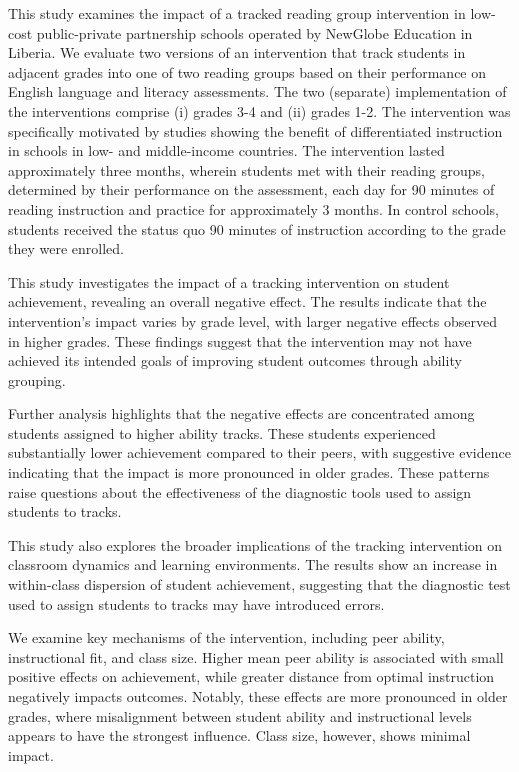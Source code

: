 \documentclass[12pt]{article}
\begin{document}
This study examines the impact of a tracked reading group intervention in low-cost public-private partnership schools operated by NewGlobe Education in Liberia. We evaluate two versions of an intervention that track students in adjacent grades into one of two reading groups based on their performance on English language and literacy assessments. The two (separate) implementation of the interventions comprise (i) grades 3-4 and (ii) grades 1-2.  The intervention was specifically motivated by studies showing the benefit of differentiated instruction in schools in low- and middle-income countries. The intervention lasted approximately three months, wherein students met with their reading groups, determined by their performance on the assessment, each day for 90 minutes of reading instruction and practice for approximately 3 months. In control schools, students received the status quo 90 minutes of instruction according to the grade they were enrolled. 

This study investigates the impact of a tracking intervention on student achievement, revealing an overall negative effect. The results indicate that the intervention's impact varies by grade level, with larger negative effects observed in higher grades. These findings suggest that the intervention may not have achieved its intended goals of improving student outcomes through ability grouping.

Further analysis highlights that the negative effects are concentrated among students assigned to higher ability tracks. These students experienced substantially lower achievement compared to their peers, with suggestive evidence indicating that the impact is more pronounced in older grades. These patterns raise questions about the effectiveness of the diagnostic tools used to assign students to tracks.

This study also explores the broader implications of the tracking intervention on classroom dynamics and learning environments. The results show an increase in within-class dispersion of student achievement, suggesting that the diagnostic test used to assign students to tracks may have introduced errors. 

We examine key mechanisms of the intervention, including peer ability, instructional fit, and class size. Higher mean peer ability is associated with small positive effects on achievement, while greater distance from optimal instruction negatively impacts outcomes. Notably, these effects are more pronounced in older grades, where misalignment between student ability and instructional levels appears to have the strongest influence. Class size, however, shows minimal impact.
\end{document}
